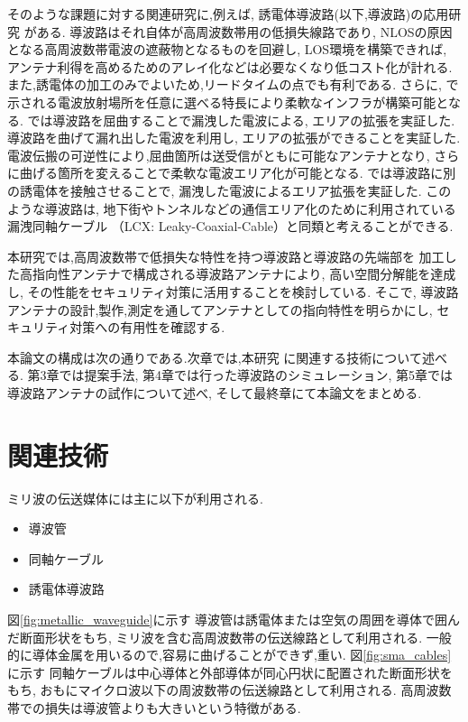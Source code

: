 \documentclass[technicalreport]{ieicej}
\begin{document}
そのような課題に対する関連研究に,例えば,
誘電体導波路(以下,導波路)の応用研究
\cite{bending_antenna} \cite{leaky_wave_antenna_bent_dielectric}
がある.
導波路はそれ自体が高周波数帯用の低損失線路であり,
NLOSの原因となる高周波数帯電波の遮蔽物となるものを回避し,
LOS環境を構築できれば,
アンテナ利得を高めるためのアレイ化などは必要なくなり低コスト化が計れる.
また,誘電体の加工のみでよいため,リードタイムの点でも有利である.
さらに,\cite{bending_antenna}
\cite{leaky_wave_antenna_bent_dielectric} \cite{pinching_antenna}
で示される電波放射場所を任意に選べる特長により柔軟なインフラが構築可能となる.
\cite{bending_antenna}では導波路を屈曲することで漏洩した電波による,
エリアの拡張を実証した.
導波路を曲げて漏れ出した電波を利用し,
エリアの拡張ができることを実証した.
電波伝搬の可逆性により,屈曲箇所は送受信がともに可能なアンテナとなり,
さらに曲げる箇所を変えることで柔軟な電波エリア化が可能となる.
\cite{leaky_wave_antenna_bent_dielectric} \cite{pinching_antenna}
では導波路に別の誘電体を接触させることで,
漏洩した電波によるエリア拡張を実証した.
このような導波路は,
地下街やトンネルなどの通信エリア化のために利用されている漏洩同軸ケーブル
（LCX: Leaky-Coaxial-Cable）と同類と考えることができる.

本研究では,高周波数帯で低損失な特性を持つ導波路と導波路の先端部を
加工した高指向性アンテナで構成される導波路アンテナにより,
高い空間分解能を達成し,
その性能をセキュリティ対策に活用することを検討している.
そこで,
導波路アンテナの設計,製作,測定を通してアンテナとしての指向特性を明らかにし,
セキュリティ対策への有用性を確認する.

本論文の構成は次の通りである.次章では,本研究
に関連する技術について述べる.
第3章では提案手法,
第4章では行った導波路のシミュレーション,
第5章では導波路アンテナの試作について述べ,
そして最終章にて本論文をまとめる.

\section{関連技術}

ミリ波の伝送媒体には主に以下が利用される.
\begin{itemize}
  \item 導波管
  \item 同軸ケーブル
  \item 誘電体導波路
\end{itemize}

図\ref{fig:metallic_waveguide}に示す
導波管は誘電体または空気の周囲を導体で囲んだ断面形状をもち,
ミリ波を含む高周波数帯の伝送線路として利用される.
一般的に導体金属を用いるので,容易に曲げることができず,重い.
図\ref{fig:sma_cables}に示す
同軸ケーブルは中心導体と外部導体が同心円状に配置された断面形状をもち,
おもにマイクロ波以下の周波数帯の伝送線路として利用される.
高周波数帯での損失は導波管よりも大きいという特徴がある.
\end{document}

